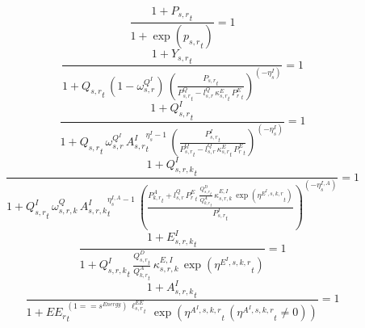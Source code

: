 \noindent[name= `regional subsector price level 4 1']
\begin{dmath}
\frac{1+{{P_{s,r}}}_{t}}{1+\exp\left({{p_{s,r}}}_{t}\right)}=1
\end{dmath}
\noindent[name= `demand for regional sector value added 4 1']
\begin{dmath}
\frac{1+{{Y_{s,r}}}_{t}}{1+{{Q_{s,r}}}_{t}\, \left(1-{{\omega^{Q^{I}}_{s,r}}}\right)\, \left(\frac{{{P_{s,r}}}_{t}}{{{P^Q_{s,r}}}_{t}-{{l^{Q}_{s,r}}}\, {{\kappa^{E}_{s,r}}}_{t}\, {{P^E_r}}_{t}}\right)^{\left(-{{\eta^{I}_{s}}}\right)}}=1
\end{dmath}
\noindent[name= `regional sector demand for intermediate composite 4 1']
\begin{dmath}
\frac{1+{{Q^{I}_{s,r}}}_{t}}{1+{{Q_{s,r}}}_{t}\, {{\omega^{Q^{I}}_{s,r}}}\, {{A^{I}_{s,r}}}_{t}^{{{\eta^{I}_{s}}}-1}\, \left(\frac{{{P^{I}_{s,r}}}_{t}}{{{P^Q_{s,r}}}_{t}-{{l^{Q}_{s,r}}}\, {{\kappa^{E}_{s,r}}}_{t}\, {{P^E_r}}_{t}}\right)^{\left(-{{\eta^{I}_{s}}}\right)}}=1
\end{dmath}
\noindent[name= `regional sector demand for intermediates from aggregate sector 4 1 1']
\begin{dmath}
\frac{1+{{Q^{I}_{s,r,k}}}_{t}}{1+{{Q^{I}_{s,r}}}_{t}\, {{\omega^{Q}_{s,r,k}}}\, {{A^{I}_{s,r,k}}}_{t}^{{{\eta^{I,A}_{s}}}-1}\, \left(\frac{{{P^{A}_{k,r}}}_{t}+{{l^{Q}_{s,r}}}\, {{P^E_r}}_{t}\, \frac{{{Q^{D}_{s,r}}}_{t}}{{{Q^{A}_{k,r}}}_{t}}\, {{\kappa^{E,I}_{s,r,k}}}\, \exp\left({{\eta^{E^{I},s,k,r}}}_{t}\right)}{{{P^{I}_{s,r}}}_{t}}\right)^{\left(-{{\eta^{I,A}_{s}}}\right)}}=1
\end{dmath}
\noindent[name= `regional emissions caused by using intermediates from aggregate sector 4 1 1']
\begin{dmath}
\frac{1+{{E^I_{s,r,k}}}_{t}}{1+{{Q^{I}_{s,r,k}}}_{t}\, \frac{{{Q^{D}_{s,r}}}_{t}}{{{Q^{A}_{k,r}}}_{t}}\, {{\kappa^{E,I}_{s,r,k}}}\, \exp\left({{\eta^{E^{I},s,k,r}}}_{t}\right)}=1
\end{dmath}
\noindent[name= `productivity of intermediates in subsector 4 region 1 from sector 1']
\begin{dmath}
\frac{1+{{A^{I}_{s,r,k}}}_{t}}{1+{{EE_r}}_{t}^{\left(1=={{s^{Energy}}}\right)\, {{\ell^{EE}_{s,r}}}_{t}}\, \exp\left({{\eta^{A^{I},s,k,r}}}_{t}\, \left({{\eta^{A^{I},s,k,r}}}_{t}\neq 0\right)\right)}=1
\end{dmath}
\noindent[name= `regional sector demand for intermediates from aggregate sector 4 1 2']
